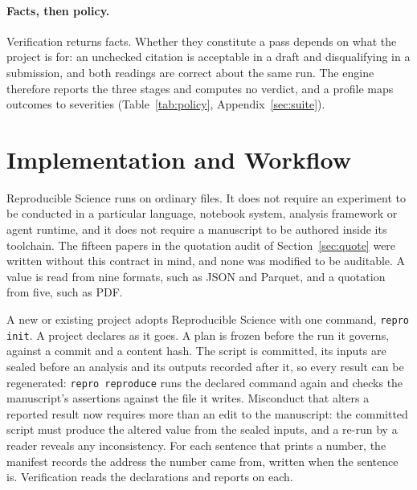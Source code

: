 \documentclass{article}
\newcommand{\code}[1]{\texttt{#1}}
\begin{document}
\paragraph{Facts, then policy.} Verification returns facts. Whether they constitute a pass depends
on what the project is for: an unchecked citation is acceptable in a draft and disqualifying in a
submission, and both readings are correct about the same run. The engine therefore reports the
three stages and computes no verdict, and a profile maps outcomes to severities
(Table~\ref{tab:policy}, Appendix~\ref{sec:suite}).

\section{Implementation and Workflow}
\label{sec:use}

Reproducible Science runs on ordinary files. It does not require an experiment to be conducted in a
particular language, notebook system, analysis framework or agent runtime, and it does not require
a manuscript to be authored inside its toolchain. The fifteen papers in the quotation audit of Section~\ref{sec:quote} were
written without this contract in mind, and none was modified to be auditable. A value is read
from nine formats, such as JSON and Parquet, and a quotation from five, such as PDF.

A new or existing project adopts Reproducible Science with one command, \code{repro init}. A project declares as it goes. A plan is frozen before the run it governs, against a commit and a
content hash. The script is committed, its inputs are sealed before an analysis and its outputs recorded after
it, so every result can be regenerated: \code{repro reproduce} runs the declared command again and checks the manuscript's assertions
against the file it writes. Misconduct that alters a reported result now requires more than an edit to the
manuscript: the committed script must produce the altered value from the sealed inputs, and a
re-run by a reader reveals any inconsistency. For each sentence that prints a number, the manifest records the address the number came from,
written when the sentence is. Verification reads the declarations and reports on each.
\end{document}
